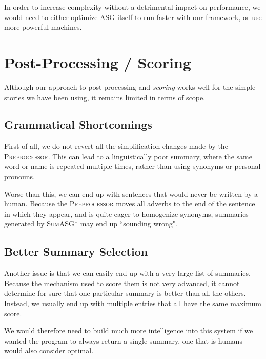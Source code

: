 In order to increase complexity without a detrimental impact on performance, we would need to either optimize ASG itself to run faster with our framework, or use more powerful machines.

\section{Post-Processing / Scoring}

Although our approach to post-processing and \textit{scoring} works well for the simple stories we have been using, it remains limited in terms of scope.

\subsection{Grammatical Shortcomings}

First of all, we do not revert all the simplification changes made by the \textsc{Preprocessor}. This can lead to a linguistically poor summary, where the same word or name is repeated multiple times, rather than using synonyms or personal pronouns.

Worse than this, we can end up with sentences that would never be written by a human. Because the \textsc{Preprocessor} moves all adverbs to the end of the sentence in which they appear, and is quite eager to homogenize synonyms, summaries generated by \textsc{SumASG*} may end up ``sounding wrong".

\subsection{Better Summary Selection}

Another issue is that we can easily end up with a very large list of summaries. Because the mechanism used to score them is not very advanced, it cannot determine for sure that one particular summary is better than all the others. Instead, we usually end up with multiple entries that all have the same maximum score.

We would therefore need to build much more intelligence into this system if we wanted the program to always return a single summary, one that is humans would also consider optimal.
